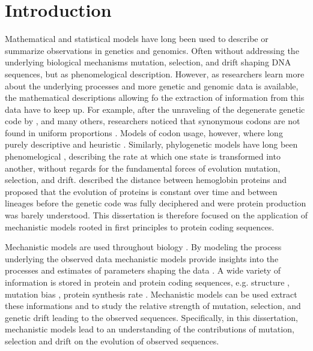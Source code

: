 \chapter{Introduction} 
\label{ch:introduction}

Mathematical and statistical models have long been used to describe or summarize observations in genetics and genomics.
Often without addressing the underlying biological mechanisms mutation, selection, and drift shaping DNA sequences, but as phenomelogical description.
However, as researchers learn more about the underlying processes and more genetic and genomic data is available, the mathematical descriptions allowing fo the extraction of information from this data have to keep up.
For example, after the unraveling of the degenerate genetic code by \citet{MatthaeiAndNirenberg1961,NirenbergAndMatthaei1961,Maxwell1962,LederAndNirenberg1964}, and many others, researchers noticed that synonymous codons are not found in uniform proportions \citep{fitch1976,grantham1980,ikemura1981,grantham1981,sharp1988}.
Models of codon usage, however, where long purely descriptive and heuristic \citep{ikemura1981,BennetzenAndHall1982,sharp1987,Wright1990}.
Similarly, phylogenetic models have long been phenomelogical \citep{JukesAndCantor1969,Dayhoff1978,Kimura1980,felsenstein1981,Altschul1991}, describing the rate at which one state is transformed into another, without regards for the fundamental forces of evolution mutation, selection, and drift.
\citet{ZuckerkandlAndPauling1962} described the distance between hemoglobin proteins and proposed that the evolution of proteins is constant over time and between lineages before the genetic code was fully deciphered and were protein production was barely understood.
This dissertation is therefore focused on the application of mechanistic models rooted in first principles to protein coding sequences.

Mechanistic models are used throughout biology \citep{GoldmanAndYang1994,loreau1998,DavisAndPelsor2001,adf2007,McGill2007}.
By modeling the process underlying the observed data mechanistic models provide insights into the processes and estimates of parameters shaping the data \citep{Liberles2013}.
A wide variety of information is stored in protein and protein coding sequences, e.g. structure \citep{anfinsen1973}, mutation bias \citep{ShahAndGilchrist2011, gilchrist2015}, protein synthesis rate \citep{gilchrist2007,gilchrist2015}. 
Mechanistic models can be used extract these informations and to study the relative strength of mutation, selection, and genetic drift leading to the observed sequences.
Specifically, in this dissertation, mechanistic models lead to an understanding of the contributions of mutation, selection and drift on the evolution of observed sequences.


